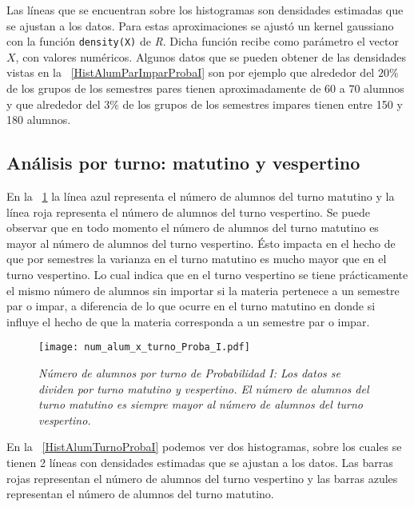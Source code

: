 Las líneas que se encuentran sobre los histogramas son densidades estimadas que se ajustan a los datos. Para estas aproximaciones se ajustó un kernel gaussiano con la función \verb+density(X)+ de \textit{R}. Dicha función recibe como parámetro el vector $X$, con valores numéricos. Algunos datos que se pueden obtener de las densidades vistas en la \figurename{~\ref{HistAlumParImparProbaI}} son por ejemplo que alrededor del $20\%$ de los grupos de los semestres pares tienen aproximadamente de $60$ a $70$ alumnos y que alrededor del $3\%$ de los grupos de los semestres impares tienen entre 150 y 180 alumnos. %



\subsection{Análisis por turno: matutino y vespertino}

En la \figurename{~\ref{num_alum_x_turno_Proba_I}} la línea azul representa el número de alumnos del turno matutino y la línea roja representa el número de alumnos del turno vespertino. Se puede observar que en todo momento el número de alumnos del turno matutino es mayor al número de alumnos del turno vespertino. Ésto impacta en el hecho de que por semestres la varianza en el turno matutino es mucho mayor que en el turno vespertino. Lo cual indica que en el turno vespertino se tiene prácticamente el mismo número de alumnos sin importar si la materia pertenece a un semestre par o impar, a diferencia de lo que ocurre en el turno matutino en donde si influye el hecho de que la materia corresponda a un semestre par o impar.


\begin{figure}[H]
\centering
\texttt{[image: num\_alum\_x\_turno\_Proba\_I.pdf]} %
\caption[\textit{Número de alumnos por turno: Probabilidad I}]{\textit{Número de alumnos por turno de Probabilidad I: Los datos se dividen por turno matutino y vespertino. El número de alumnos del turno matutino es siempre mayor al número de alumnos del turno vespertino.}}\label{num_alum_x_turno_Proba_I}
\end{figure}

En la \figurename{~\ref{HistAlumTurnoProbaI}} podemos ver dos histogramas, sobre los cuales se tienen 2 líneas con  densidades estimadas que se ajustan a los datos. Las barras rojas representan el número de alumnos del turno vespertino y las barras azules representan el número de alumnos del turno matutino.

